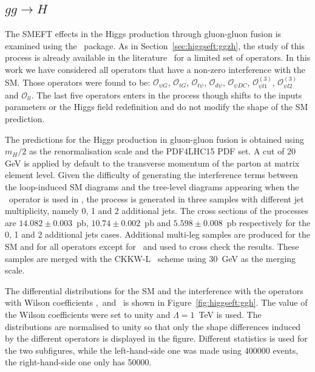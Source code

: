 \subsection{$gg\to H$}
\label{sec:higgseft:section3}
The SMEFT effects in the Higgs production through gluon-gluon fusion is examined using the \SMEFTatNLO\ package. As in Section~\ref{sec:higgseft:ggzh}, the 
study of this process is already available in the literature~\cite{Deutschmann:2017qum} for a limited set of operators. In this work we have considered all operators that have a non-zero interference with the SM. Those operators were found to be:
$\mathcal{O}_{\psi G}$, $\mathcal{O}_{tG}$, $\mathcal{O}_{t\psi}$, $\mathcal{O}_{d\psi}$, $\mathcal{O}_{\psi DC}$, $\mathcal{O}_{\psi l1}^{(3)}$, $\mathcal{O}_{ \psi l2}^{(3)}$ and $\mathcal{O}_{ll}$.
The last five operators enters in the process though shifts to the inputs parameters or the Higgs field redefinition and do not modify the shape of the SM prediction.

The predictions for the Higgs production in gluon-gluon fusion is obtained using $m_H/2$ as the renormalisation scale and the PDF4LHC15 PDF set. A cut of 20 GeV is applied by default to the transverse momentum of the parton at matrix element level. Given the difficulty of generating the interference terms between the loop-induced SM diagrams and the tree-level diagrams appearing when the \cpG\ operator is used in \Madgraph, the process is generated in three samples with different jet multiplicity, namely 0, 1 and 2 additional jets. The cross sections of the processes are
$14.082 \pm 0.003$~pb, $10.74\pm0.002$~pb and $5.598\pm0.008$~pb respectively for the 0, 1 and 2 additional jets cases. Additional multi-leg samples are produced for the SM and for all operators except for \cpG\  and used to cross check the results. These samples are merged with the CKKW-L~\cite{Lonnblad:2001iq} scheme using $30$~GeV as the merging scale.


The differential distributions for the SM and the interference with the operators with Wilson coefficients \cpG ,\ctG\ and \ctp\ is shown in Figure~\ref{fig:higgseft:ggh}. The value of the Wilson coefficients were set to unity and $\Lambda=1$~TeV is used. The distributions are normalised to unity so that only the shape differences induced by the different operators is displayed in the figure. Different statistics is used for the two subfigures, while the left-hand-side one was made using 400000 events, the right-hand-side one only has 50000.



